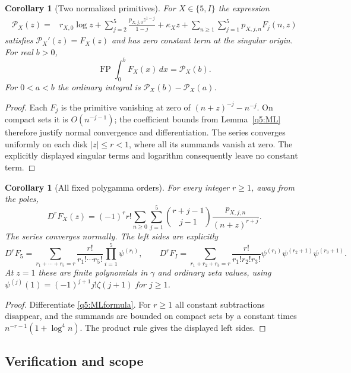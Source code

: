 \documentclass[11pt,a4paper]{article}
\numberwithin{equation}{section}
\newtheorem{corollary}[theorem]{Corollary}
\theoremstyle{definition}
\begin{document}
\begin{corollary}[Two normalized primitives]\label{q5:primitives}
For $X\in\{5,I\}$ the expression
\begin{align}\label{q5:primitiveformula}
 \mathcal P_X(z)={}&r_{X,0}\log z
       +\sum_{j=2}^5\frac{p_{X,j,0}z^{1-j}}{1-j}
       +\kappa_Xz
       +\sum_{n\geq1}\sum_{j=1}^5p_{X,j,n}F_j(n,z)
\end{align}
satisfies $\mathcal P_X'(z)=F_X(z)$ and has zero constant term
at the singular origin.  For real $b>0$,
\[
 \operatorname{FP}\int_0^bF_X(x)\,dx=\mathcal P_X(b).
\]
For $0<a<b$ the ordinary integral is
$\mathcal P_X(b)-\mathcal P_X(a)$.
\end{corollary}
\begin{proof}
Each $F_j$ is the primitive vanishing at zero of
$(n+z)^{-j}-n^{-j}$.  On compact sets it is $O(n^{-j-1})$;
the coefficient bounds from Lemma~\ref{q5:ML} therefore justify normal
convergence and differentiation.  The series converges uniformly on
each disk $|z|\leq r<1$, where all its summands vanish at zero.
The explicitly displayed singular terms and logarithm consequently
leave no constant term.
\end{proof}

\begin{corollary}[All fixed polygamma orders]\label{q5:derivative}
For every integer $r\geq1$, away from the poles,
\begin{equation}\label{q5:derivatives}
 D^rF_X(z)=(-1)^r r!
       \sum_{n\geq0}\sum_{j=1}^5
       \binom{r+j-1}{j-1}\frac{p_{X,j,n}}{(n+z)^{r+j}}.
\end{equation}
The series converges normally.  The left sides are explicitly
\[
 D^rF_5=
 \sum_{r_1+\cdots+r_5=r}\frac{r!}{r_1!\cdots r_5!}
                  \prod_{i=1}^5\psi^{(r_i)},
 \qquad
 D^rF_I=
 \sum_{r_1+r_2+r_3=r}\frac{r!}{r_1!r_2!r_3!}
         \psi^{(r_1)}\psi^{(r_2+1)}\psi^{(r_3+1)}.
\]
At $z=1$ these are finite polynomials in $\gamma$ and ordinary
zeta values, using
$\psi^{(j)}(1)=(-1)^{j+1}j!\zeta(j+1)$ for $j\geq1$.
\end{corollary}
\begin{proof}
Differentiate \eqref{q5:MLformula}.  For $r\geq1$ all constant
subtractions disappear, and the summands are bounded on compact sets
by a constant times $n^{-r-1}(1+\log^4n)$.  The product rule gives
the displayed left sides.
\end{proof}

\subsection{Verification and scope}
\end{document}
